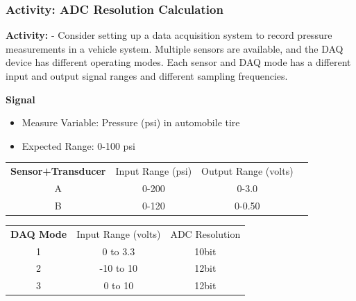 \documentclass[fleqn]{beamer} %
\newcommand{\sectionIsubsectionIVtitle}{Activity: ADC Resolution Calculation}
\begin{document}
			\begin{frame}
				\frametitle{\sectionIsubsectionIVtitle} \scriptsize


				\textbf{Activity:} - Consider setting up a data acquisition system to record pressure measurements in a vehicle system. Multiple sensors are available, and the DAQ device has different operating modes. Each sensor and DAQ mode has a different input and output signal ranges and different sampling frequencies. \vspc
				
				
				\textbf{Signal}
				\begin{itemize}
					\item Measure Variable: Pressure (psi) in automobile tire 
					\item Expected Range:	0-100 psi 
				\end{itemize}
				\vspace*{2mm}
					\begin{tabular}{ cc c c}
						{\bf Sensor+Transducer} & Input Range (psi) & Output Range (volts)\\ 
						A & 0-200	& 0-3.0 \\
						B & 0-120  & 0-0.50 \\  
						   
					\end{tabular}
				\vspace*{2mm}
					\begin{tabular}{ c c c }
						{\bf DAQ Mode} & Input Range (volts) & ADC Resolution \\ 
						1 & 0 to 3.3	& 10bit \\
						2 & -10 to 10  & 12bit  \\  
            3 & 0 to 10 & 12bit \\						    
 
					\end{tabular}

			\end{frame}
\end{document}
